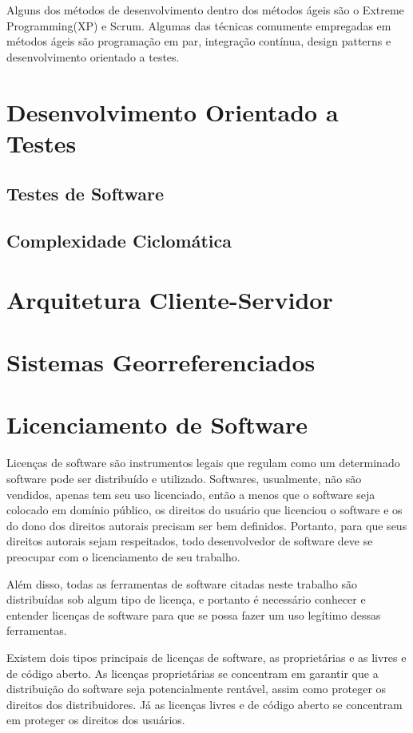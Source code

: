 Alguns dos métodos de desenvolvimento dentro dos métodos ágeis são o Extreme Programming(XP) e Scrum. Algumas das técnicas comumente empregadas em métodos ágeis são programação em par, integração contínua, design patterns e desenvolvimento orientado a testes.

\section{Desenvolvimento Orientado a Testes}\label{fun:tdd}

\subsection{Testes de Software}

\subsection{Complexidade Ciclomática}

\section{Arquitetura Cliente-Servidor}

\section{Sistemas Georreferenciados}

\section{Licenciamento de Software}

Licenças de software são instrumentos legais que regulam como um determinado software pode ser distribuído e utilizado.
Softwares, usualmente, não são vendidos, apenas tem seu uso licenciado, então a menos que o software seja colocado em domínio público, os direitos do usuário que licenciou o software e os do dono dos direitos autorais precisam ser bem definidos. Portanto, para que seus direitos autorais sejam respeitados, todo desenvolvedor de software deve se preocupar com o licenciamento de seu trabalho.

Além disso, todas as ferramentas de software citadas neste trabalho são distribuídas sob algum tipo de licença, e portanto é necessário conhecer e entender licenças de software para que se possa fazer um uso legítimo dessas ferramentas.

Existem dois tipos principais de licenças de software, as proprietárias e as livres e de código aberto. As licenças proprietárias se concentram em garantir que a distribuição do software seja potencialmente rentável, assim como proteger os direitos dos distribuidores. Já as licenças livres e de código aberto se concentram em proteger os direitos dos usuários.

